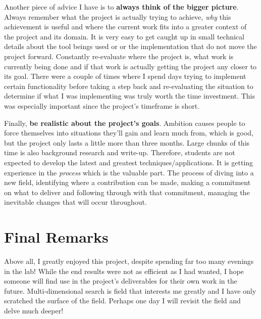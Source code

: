 Another piece of advice I have is to \textbf{always think of the bigger picture}. Always remember what the project is actually trying to achieve, \textit{why} this achievement is useful and where the current work fits into a greater context of the project and its domain. It is very easy to get caught up in small technical details about the tool beings used or or the implementation that do not move the project forward. Constantly re-evaluate where the project is, what work is currently being done and if that work is actually getting the project any closer to its goal. There were a couple of times where I spend days trying to implement certain functionality before taking a step back and re-evaluating the situation to determine if what I was implementing was truly worth the time investment. This was especially important since the project's timeframe is short.

Finally, \textbf{be realistic about the project's goals}. Ambition causes people to force themselves into situations they'll gain and learn much from, which is good, but the project only lasts a little more than three months. Large chunks of this time is also background research and write-up. Therefore, students are not expected to develop the latest and greatest techniques/applications. It is getting experience in the \textit{process} which is the valuable part. The process of diving into a new field, identifying where a contribution can be made, making a commitment on what to deliver and following through with that commitment, managing the inevitable changes that will occur throughout.

\section{Final Remarks}

Above all, I greatly enjoyed this project, despite spending far too many evenings in the lab! While the end results were not as efficient as I had wanted, I hope someone will find use in the project's deliverables for their own work in the future. Multi-dimensional search is field that interests me greatly and I have only scratched the surface of the field. Perhaps one day I will revisit the field and delve much deeper!